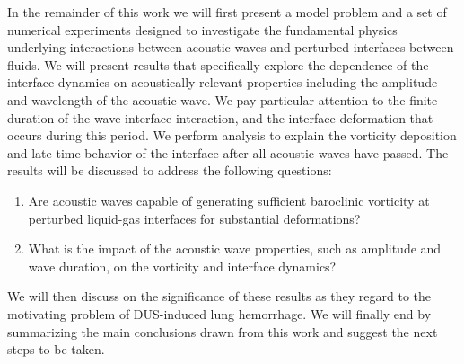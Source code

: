 In the remainder of this work we will first present a model problem
and a set of numerical experiments designed to investigate the
fundamental physics underlying interactions between acoustic waves and
perturbed interfaces between fluids. We will present results that
specifically explore the dependence of the interface dynamics on
acoustically relevant properties including the amplitude and
wavelength of the acoustic wave. We pay particular attention to the
finite duration of the wave-interface interaction, and the interface
deformation that occurs during this period. We perform analysis to
explain the vorticity deposition and late time behavior of the
interface after all acoustic waves have passed. The results will be
discussed to address the following questions:
\begin{enumerate} \label{itm:usbe_lung_questions}
\item Are acoustic waves capable of generating sufficient baroclinic
  vorticity at perturbed liquid-gas interfaces for substantial
  deformations?
\item What is the impact of the acoustic wave properties, such as
  amplitude and wave duration, on the vorticity and interface
  dynamics?
\end{enumerate}
We will then discuss on the significance of these results as
they regard to the motivating problem of \ac{DUS}-induced lung
hemorrhage. We will finally end by summarizing the main conclusions
drawn from this work and suggest the next steps to be taken.







